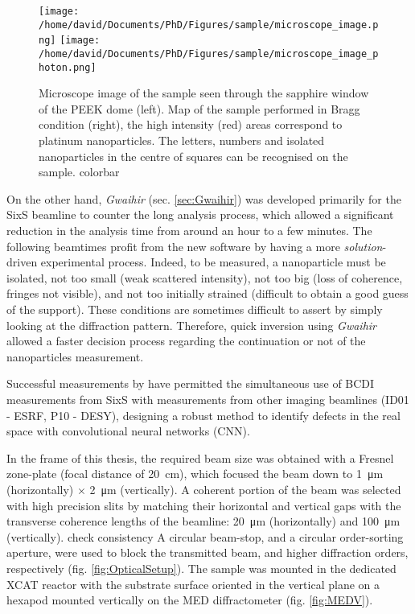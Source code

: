 \begin{figure}[!htb]
    \centering
    \texttt{[image: /home/david/Documents/PhD/Figures/sample/microscope\_image.png]}
    \texttt{[image: /home/david/Documents/PhD/Figures/sample/microscope\_image\_photon.png]}
    \caption{
        Microscope image of the sample seen through the sapphire window of the PEEK dome (left).
        Map of the sample performed in Bragg condition (right), the high intensity (red) areas correspond to platinum nanoparticles.
        The letters, numbers and isolated nanoparticles in the centre of squares can be recognised on the sample.
        \textcolor{Important}{colorbar}
    }
    \label{fig:SampleMapping}
\end{figure}

On the other hand, \textit{Gwaihir} (sec. \ref{sec:Gwaihir}) was developed primarily for the SixS beamline to counter the long analysis process, which allowed a significant reduction in the analysis time from around an hour to a few minutes.
The following beamtimes profit from the new software by having a more \textit{solution}-driven experimental process.
Indeed, to be measured, a nanoparticle must be isolated, not too small (weak scattered intensity), not too big (loss of coherence, fringes not visible), and not too initially strained (difficult to obtain a good guess of the support).
These conditions are sometimes difficult to assert by simply looking at the diffraction pattern.
Therefore, quick inversion using \textit{Gwaihir} allowed a faster decision process regarding the continuation or not of the nanoparticles measurement.

Successful measurements by \cite{Lim2021} have permitted the simultaneous use of BCDI measurements from SixS with measurements from other imaging beamlines (ID01 - ESRF, P10 - DESY), designing a robust method to identify defects in the real space with convolutional neural networks (CNN).

In the frame of this thesis, the required beam size was obtained with a Fresnel zone-plate (focal distance of \qty{20}{\cm}), which focused the beam down to \qty{1}{\um} (horizontally) $\times$ \qty{2}{\um} (vertically).
A coherent portion of the beam was selected with high precision slits by matching their horizontal and vertical gaps with the transverse coherence lengths of the beamline: \qty{20}{\um} (horizontally) and \qty{100}{\um} (vertically).
\textcolor{Important}{check consistency}
A circular beam-stop, and a circular order-sorting aperture, were used to block the transmitted beam, and higher diffraction orders, respectively (fig. \ref{fig:OpticalSetup}).
The sample was mounted in the dedicated XCAT reactor with the substrate surface oriented in the vertical plane on a hexapod mounted vertically on the MED diffractometer (fig. \ref{fig:MEDV}).

